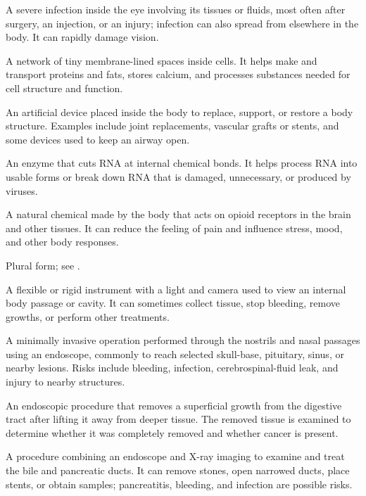  A severe infection inside the eye involving its tissues or fluids, most often after surgery, an injection, or an injury; infection can also spread from elsewhere in the body. It can rapidly damage vision.

 A network of tiny membrane-lined spaces inside cells. It helps make and transport proteins and fats, stores calcium, and processes substances needed for cell structure and function.

 An artificial device placed inside the body to replace, support, or restore a body structure. Examples include joint replacements, vascular grafts or stents, and some devices used to keep an airway open.

 An enzyme that cuts RNA at internal chemical bonds. It helps process RNA into usable forms or break down RNA that is damaged, unnecessary, or produced by viruses.

 A natural chemical made by the body that acts on opioid receptors in the brain and other tissues. It can reduce the feeling of pain and influence stress, mood, and other body responses.

 Plural form; see .

 A flexible or rigid instrument with a light and camera used to view an internal body passage or cavity. It can sometimes collect tissue, stop bleeding, remove growths, or perform other treatments.

 A minimally invasive operation performed through the nostrils and nasal passages using an endoscope, commonly to reach selected skull-base, pituitary, sinus, or nearby lesions. Risks include bleeding, infection, cerebrospinal-fluid leak, and injury to nearby structures.

 An endoscopic procedure that removes a superficial growth from the digestive tract after lifting it away from deeper tissue. The removed tissue is examined to determine whether it was completely removed and whether cancer is present.

 A procedure combining an endoscope and X-ray imaging to examine and treat the bile and pancreatic ducts. It can remove stones, open narrowed ducts, place stents, or obtain samples; pancreatitis, bleeding, and infection are possible risks.

